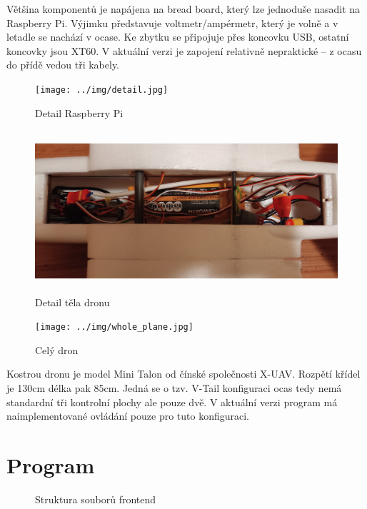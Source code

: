 \documentclass[a4paper,oneside,12pt]{report}
\begin{document}
Většina komponentů je napájena na bread board, který lze jednoduše nasadit na Raspberry Pi.
Výjimku představuje voltmetr/ampérmetr, který je volně a v letadle se nachází v ocase.
Ke zbytku se připojuje přes koncovku USB, ostatní koncovky jsou XT60.
V aktuální verzi je zapojení relativně nepraktické -- z ocasu do přídě vedou tři kabely.

\begin{figure}[h]
	\centering
	\texttt{[image: ../img/detail.jpg]}
	\caption[Detail Raspberry Pi]{Detail Raspberry Pi}
\end{figure}


\newpage

\begin{figure}[h]
	\centering
	\includegraphics[height=6cm]{../img/body.jpg}
	\caption[Detail těla dronu]{Detail těla dronu}
\end{figure}

\begin{figure}[h]
	\centering
	\texttt{[image: ../img/whole\_plane.jpg]}
	\caption[Celý dron]{Celý dron}
\end{figure}


Kostrou dronu je model Mini Talon od čínské společnosti X-UAV.
Rozpětí křídel je 130cm délka pak 85cm.
Jedná se o tzv. V-Tail konfiguraci ocas tedy nemá standardní tři kontrolní plochy ale pouze dvě.
V aktuální verzi program má naimplementované ovládání pouze pro tuto konfiguraci.

\newpage

\section{Program}

\begin{figure}[h]
	\caption[Struktura souborů frontendu, vlastní tvorba]{Struktura souborů frontend}
	\label{fig:frontendStructure}
\end{figure}
\end{document}
